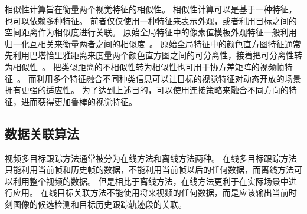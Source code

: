 相似性计算旨在衡量两个视觉特征的相似性。
相似性计算可以是基于一种特征，也可以依赖多种特征。
前者仅仅使用一种特征来表示外观，或者利用目标之间的空间距离作为相似度进行关联。
原始全局特征中的像素值模板外观特征一般利用归一化互相关来衡量两者之间的相似度~\cite{yamaguchi2011who,wu2015global}。
原始全局特征中的颜色直方图特征通常先利用巴塔恰里雅距离来度量两个颜色直方图之间的可分离性，接着把可分离性转为相似性~\cite{kratz2010tracking,qin2012improving}。
把类似距离的不相似性转为相似性也可用于协方差矩阵的视频帧特征~\cite{henriques2011globally}。
而利用多个特征融合不同种类信息可以让目标的视觉特征对动态开放的场景拥有更强的适应性。
%
为了达到上述目的，可以使用连接策略来融合不同方向的特征，进而获得更加鲁棒的视觉特征。



\subsection{数据关联算法}
视频多目标跟踪方法通常被分为在线方法和离线方法两种。
在线多目标跟踪方法只能利用当前帧和历史帧的数据，不能利用当前帧以后的任何数据，而离线方法可以利用整个视频的数据。
但是相比于离线方法，在线方法更利于在实际场景中进行应用。
在线目标关联方法不能使用将来视频的任何数据，而是应该输出当前时刻图像的候选检测和目标历史跟踪轨迹段的关联。

